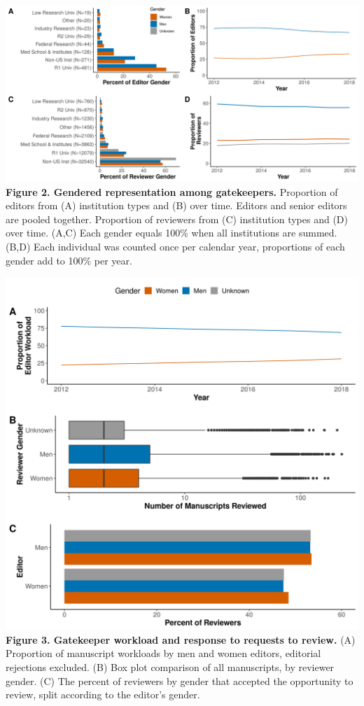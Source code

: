 \documentclass[11pt,]{article}
\begin{document}
\newpage

\includegraphics{Figure_1.png} \textbf{Figure 2. Gendered representation
among gatekeepers.} Proportion of editors from (A) institution types and
(B) over time. Editors and senior editors are pooled together.
Proportion of reviewers from (C) institution types and (D) over time.
(A,C) Each gender equals 100\% when all institutions are summed.(B,D)
Each individual was counted once per calendar year, proportions of each
gender add to 100\% per year.

\newpage

\includegraphics{Figure_2.png} \textbf{Figure 3. Gatekeeper workload and
response to requests to review.} (A) Proportion of manuscript workloads
by men and women editors, editorial rejections excluded. (B) Box plot
comparison of all manuscripts, by reviewer gender. (C) The percent of
reviewers by gender that accepted the opportunity to review, split
according to the editor's gender.
\end{document}
